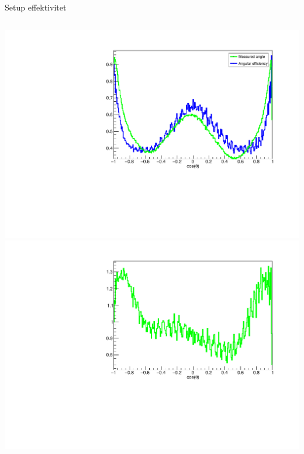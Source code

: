 \begin{frame}{Setup effektivitet}
	\begin{itemize}
	\end{itemize}
	\begin{columns}
		\includegraphics[width=\columnwidth]{../figures/betaAngles/betaAngle.pdf}
		\onslide<4->
		\includegraphics[width=\columnwidth]{../figures/betaAngles/dataDivEff.pdf}
	\end{columns}
\end{frame}

